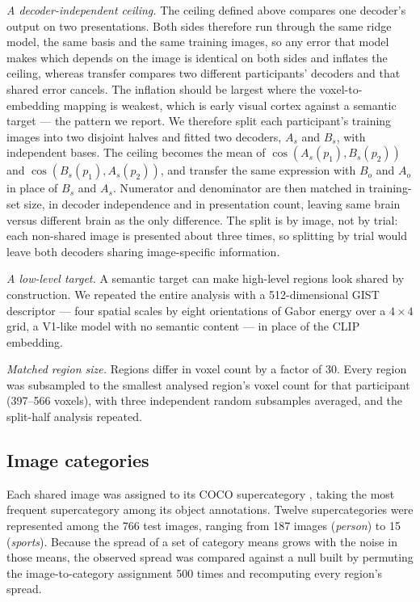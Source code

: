 \documentclass[11pt,a4paper]{article}
\begin{document}
\emph{A decoder-independent ceiling.} The ceiling defined above compares one
decoder's output on two presentations. Both sides therefore run through the same
ridge model, the same basis and the same training images, so any error that model
makes which depends on the image is identical on both sides and inflates the
ceiling, whereas transfer compares two different participants' decoders and that
shared error cancels. The inflation should be largest where the voxel-to-embedding
mapping is weakest, which is early visual cortex against a semantic target --- the
pattern we report. We therefore split each participant's training images into two
disjoint halves and fitted two decoders, $A_s$ and $B_s$, with independent bases.
The ceiling becomes the mean of $\cos(A_s(p_1), B_s(p_2))$ and
$\cos(B_s(p_1), A_s(p_2))$, and transfer the same expression with $B_o$ and $A_o$
in place of $B_s$ and $A_s$. Numerator and denominator are then matched in
training-set size, in decoder independence and in presentation count, leaving same
brain versus different brain as the only difference. The split is by image, not by
trial: each non-shared image is presented about three times, so splitting by trial
would leave both decoders sharing image-specific information.

\emph{A low-level target.} A semantic target can make high-level regions look
shared by construction. We repeated the entire analysis with a 512-dimensional
GIST descriptor \citep{oliva2001} --- four spatial scales by eight orientations of
Gabor energy over a $4\times4$ grid, a V1-like model with no semantic content ---
in place of the CLIP embedding.

\emph{Matched region size.} Regions differ in voxel count by a factor of 30. Every
region was subsampled to the smallest analysed region's voxel count for that
participant (397--566 voxels), with three independent random subsamples averaged,
and the split-half analysis repeated.

\subsection{Image categories}

Each shared image was assigned to its COCO supercategory \citep{lin2014}, taking
the most frequent supercategory among its object annotations. Twelve
supercategories were represented among the 766 test images, ranging from 187
images (\emph{person}) to 15 (\emph{sports}). Because the spread of a set of
category means grows with the noise in those means, the observed spread was
compared against a null built by permuting the image-to-category assignment 500
times and recomputing every region's spread.
\end{document}
